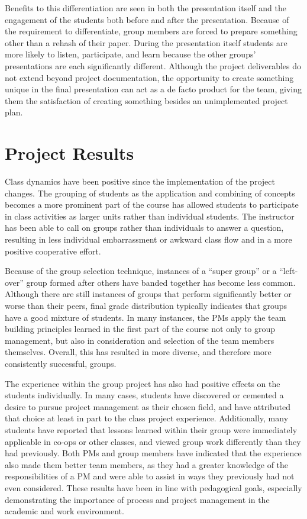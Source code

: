 \documentclass{sig-alternate}
\begin{document}
Benefits to this differentiation are seen in both the presentation itself and the engagement of the
students both before and after the presentation. Because of the requirement to differentiate, 
group members are forced to prepare something other than a rehash of their paper.  During the
presentation itself students are more likely to listen, participate, and learn because the other groups'
presentations are each significantly different. Although the project deliverables do not extend beyond
project documentation, the opportunity to create something unique in the final presentation can act as a de
facto product for the team, giving them the satisfaction of creating something besides an unimplemented
project plan.

\section{Project Results}
\label{sec:results}
Class dynamics have been positive since the implementation of the project changes. The grouping of
students as the application and combining of concepts becomes a more prominent part of the course has
allowed students to participate in class activities as larger units rather than individual students. The
instructor has been able to call on groups rather than individuals to answer a question, resulting in less
individual embarrassment or awkward class flow and in a more positive cooperative effort.

Because of the group selection technique, instances of a ``super group'' or a ``left-over'' group formed after others 
have banded together has become less common.  Although there are still instances of
groups that perform significantly better or worse than their peers, final grade distribution typically indicates
that groups have a good mixture of students. In many instances, the PMs apply the team building principles
learned in the first part of the course not only to group management, but also in consideration and
selection of the team members themselves. Overall, this has resulted in more diverse, and therefore more
consistently successful, groups.

The experience within the group project has also had positive effects on the students individually. In
many cases, students have discovered or cemented a desire to pursue project management as their chosen
field, and have attributed that choice at least in part to the class project experience. Additionally, many
students have reported that lessons learned within their group were immediately applicable in co-ops or
other classes, and viewed group work differently than they had previously. Both PMs and group members
have indicated that the experience also made them better team members, as they had a greater knowledge
of the responsibilities of a PM and were able to assist in ways they previously had not even considered.
These results have been in line with pedagogical goals, especially demonstrating the importance of process 
and project management in the academic and work environment.
\end{document}

